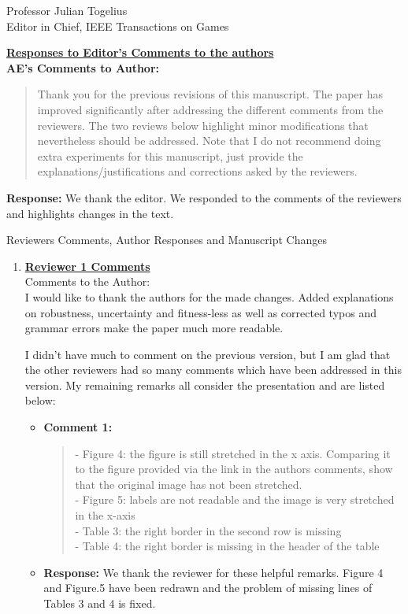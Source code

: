 \documentclass[10pt]{letter} %
\begin{document}
\begin{letter}{Professor Julian Togelius \\ Editor in Chief, IEEE Transactions on Games}
\newpage


{\bf \underline{ Responses to Editor's  Comments to the authors}}\\

	\bf  {\bf AE's Comments to Author:} 
				\begin{quote}	
Thank you for the previous revisions of this manuscript. The paper has improved significantly after addressing the different comments from the reviewers. The two reviews below highlight minor modifications that nevertheless should be addressed. Note that I do not recommend doing extra experiments for this manuscript, just provide the explanations/justifications and corrections asked by the reviewers.
				\end{quote}	
 {\bf Response:} 
We thank the editor. We responded to the comments of the reviewers and highlights changes in the text. 

\newpage
 Reviewers Comments, Author Responses and Manuscript Changes
\begin{enumerate}

\item {\bf \underline{ Reviewer 1 Comments}}\\
		Comments to the Author:\\
	I would like to thank the authors for the made changes. Added explanations on robustness, uncertainty and fitness-less as well as corrected typos and grammar errors make the paper much more readable.
	
	I didn't have much to comment on the previous version, but I am glad that the other reviewers had so many comments which have been addressed in this version. My remaining remarks all consider the presentation and are listed below:
\begin{itemize}
	\item {\bf Comment 1:}
	\begin{quote}	
	- Figure 4: the figure is still stretched in the x axis. Comparing it to the figure provided via the link in the authors comments, show that the original image has not been stretched.\\
	- Figure 5: labels are not readable and the image is very stretched in the x-axis\\
	- Table 3: the right border in the second row is missing\\
	- Table 4: the right border is missing in the header of the table
	\end{quote}	
	\item {\bf Response:} 
		We thank the reviewer for these helpful remarks. Figure 4 and Figure.5 have been redrawn and the problem of missing lines of Tables 3 and 4 is fixed.
\end{itemize}


\end{enumerate}
\end{letter}
\end{document}
